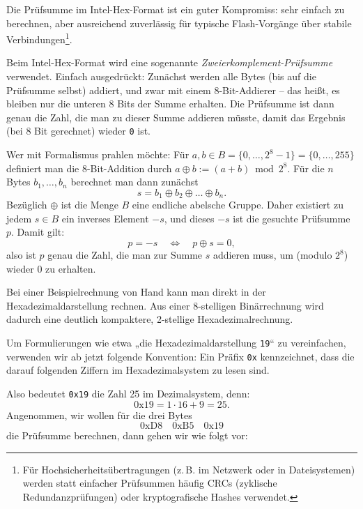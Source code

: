 \documentclass[a4paper,12pt]{article}
\begin{document}
\noindent
Die Prüfsumme im Intel-Hex-Format ist ein guter Kompromiss: sehr einfach zu
berechnen, aber ausreichend zuverlässig für typische Flash-Vorgänge über
stabile Verbindungen\footnote{
Für Hochsicherheitsübertragungen (z.\,B. im Netzwerk oder in Dateisystemen)
werden statt einfacher Prüfsummen häufig CRCs (zyklische Redundanzprüfungen)
oder kryptografische Hashes verwendet.}.

\begin{tcolorbox}[
    colback=myblue!5!white,
    colframe=myblue,
    title=Berechnung der Prüfsumme im Intel-Hex-Format
]
    Beim Intel-Hex-Format wird eine sogenannte
    \emph{Zweierkomplement-Prüfsumme} verwendet.  Einfach ausgedrückt: Zunächst
    werden alle Bytes (bis auf die Prüfsumme selbst) addiert, und zwar mit
    einem 8-Bit-Addierer – das heißt, es bleiben nur die unteren 8 Bits der
    Summe erhalten.  Die Prüfsumme ist dann genau die Zahl, die man zu dieser
    Summe addieren müsste, damit das Ergebnis (bei 8 Bit gerechnet) wieder
    \texttt{0} ist.

    Wer mit Formalismus prahlen möchte: Für
    $a, b \in B = \{0,\dots,2^8-1\} = \{0,\dots,255\}$
    definiert man die 8-Bit-Addition durch $a \oplus b := (a + b) \bmod 2^8$.  
    Für die $n$ Bytes $b_1, \dots, b_n$ berechnet man dann zunächst
    \[
	s = b_1 \oplus b_2 \oplus \dots \oplus b_n.
    \]
    Bezüglich $\oplus$ ist die Menge $B$ eine endliche abelsche Gruppe.
    Daher existiert zu jedem $s \in B$ ein inverses Element $-s$, und dieses
    $-s$ ist die gesuchte Prüfsumme $p$.  Damit gilt:
    \[
	p = -s \quad \Leftrightarrow \quad p \oplus s = 0,
    \]
    also ist $p$ genau die Zahl, die man zur Summe $s$ addieren muss, um
    (modulo $2^8$) wieder $0$ zu erhalten.
\end{tcolorbox}

\noindent
Bei einer Beispielrechnung von Hand kann man direkt in der
Hexadezimaldarstellung rechnen.  Aus einer 8-stelligen Binärrechnung wird
dadurch eine deutlich kompaktere, 2-stellige Hexadezimalrechnung.

Um Formulierungen wie etwa „die Hexadezimaldarstellung \texttt{19}“ zu
vereinfachen, verwenden wir ab jetzt folgende Konvention:  
Ein Präfix \texttt{0x} kennzeichnet, dass die darauf folgenden Ziffern im
Hexadezimalsystem zu lesen sind.

Also bedeutet \texttt{0x19} die Zahl 25 im Dezimalsystem, denn:
\[
    \text{0x}19 = 1 \cdot 16 + 9 = 25.
\]
Angenommen, wir wollen für die drei Bytes
\[
    \text{0xD8} \quad \text{0xB5} \quad \text{0x19}
\]
die Prüfsumme berechnen, dann gehen wir wie folgt vor:
\end{document}
